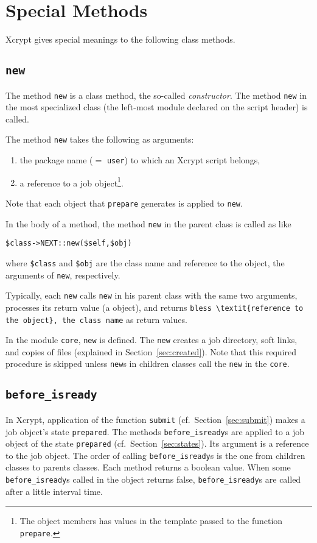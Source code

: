 \documentclass[a4paper,10pt]{report}
\def\|{\verb|} %|
\begin{document}
\section{Special Methods}

Xcrypt gives special meanings to the following class methods.

\subsection{\texttt{new}}

The method \texttt{new} is a class method, the so-called
\textit{constructor}.  The method \|new| in the most specialized class
(the left-most module declared on the script header) is called.

The method \|new| takes the following as arguments:
\begin{enumerate}
\item the package name ($=$ \|user|) to which an Xcrypt script belongs,
\item a reference to a job object\footnote{The object members has
      values in the template passed to the function \texttt{prepare}.}.
\end{enumerate}
Note that each object that \|prepare| generates is applied to \|new|.

In the body of a method, the method \|new| in the parent class is
called as like
\begin{center}
 \|$class->NEXT::new($self,$obj)|
\end{center}
where \|$class| and \|$obj| are the class name and reference to the
object, the arguments of \|new|, respectively.

Typically, each \|new| calls \|new| in his parent class with the same
two arguments, processes its return value (a object), and returns
\|bless \textit{reference to the object}, the class name| as return values.

In the module \|core|, \|new| is defined.  The \|new| creates a job
directory, soft links, and copies of files (explained in
Section~\ref{sec:created}).  Note that this required procedure is
skipped unless \|new|s in children classes call the \|new| in the
\|core|.

\subsection{\texttt{before\_isready}}

In Xcrypt, application of the function \|submit| (cf.\
Section~\ref{sec:submit}) makes a job object's state \|prepared|.  The
methods \texttt{before\_isready}s are applied to a job object of the
state \|prepared| (cf.\ Section~\ref{sec:states}).  Its argument is a
reference to the job object.  The order of calling
\texttt{before\_isready}s is the one from children classes to parents
classes.  Each method returns a boolean value.  When some
\texttt{before\_isready}s called in the object returns false,
\texttt{before\_isready}s are called after a little interval time.
\end{document}
